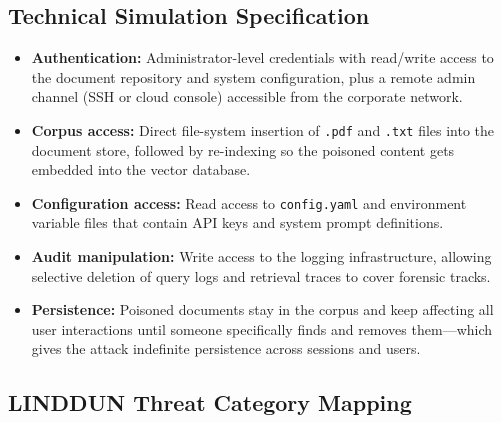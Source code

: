 \documentclass[a4paper,12pt]{report}
\begin{document}
\subsection{Technical Simulation Specification}

\begin{prosebox}
\begin{itemize}[leftmargin=1.4em, itemsep=3pt]
  \item \textbf{Authentication:} Administrator-level credentials with
        read/write access to the document repository and system configuration,
        plus a remote admin channel (SSH or cloud console) accessible from
        the corporate network.
  \item \textbf{Corpus access:} Direct file-system insertion of \texttt{.pdf}
        and \texttt{.txt} files into the document store, followed by
        re-indexing so the poisoned content gets embedded into the vector database.
  \item \textbf{Configuration access:} Read access to \texttt{config.yaml}
        and environment variable files that contain API keys and system prompt
        definitions.
  \item \textbf{Audit manipulation:} Write access to the logging
        infrastructure, allowing selective deletion of query logs and
        retrieval traces to cover forensic tracks.
  \item \textbf{Persistence:} Poisoned documents stay in the corpus and
        keep affecting all user interactions until someone specifically finds
        and removes them---which gives the attack indefinite persistence
        across sessions and users.
\end{itemize}
\end{prosebox}

\subsection{LINDDUN Threat Category Mapping}
\end{document}
